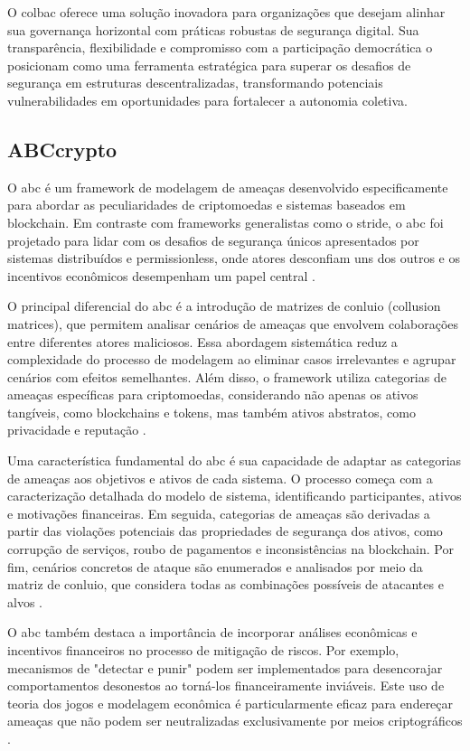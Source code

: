 O \gls{colbac} oferece uma solução inovadora para organizações que desejam
alinhar sua governança horizontal com práticas robustas de segurança
digital. Sua transparência, flexibilidade e compromisso com a
participação democrática o posicionam como uma ferramenta estratégica
para superar os desafios de segurança em estruturas descentralizadas,
transformando potenciais vulnerabilidades em oportunidades para
fortalecer a autonomia coletiva.

\subsection{ABCcrypto}
\label{subsec:abccrypto}

O \gls{abc} é um framework de modelagem de
ameaças desenvolvido especificamente para abordar as peculiaridades de
criptomoedas e sistemas baseados em blockchain. Em contraste com
frameworks generalistas como o \gls{stride}, o \gls{abc} foi projetado para lidar
com os desafios de segurança únicos apresentados por sistemas
distribuídos e permissionless, onde atores desconfiam uns dos outros e
os incentivos econômicos desempenham um papel central
\cite{AbcCrypto}.

O principal diferencial do \gls{abc} é a introdução de matrizes de conluio
(collusion matrices), que permitem analisar cenários de ameaças que
envolvem colaborações entre diferentes atores maliciosos. Essa
abordagem sistemática reduz a complexidade do processo de modelagem ao
eliminar casos irrelevantes e agrupar cenários com efeitos
semelhantes. Além disso, o framework utiliza categorias de ameaças
específicas para criptomoedas, considerando não apenas os ativos
tangíveis, como blockchains e tokens, mas também ativos abstratos,
como privacidade e reputação \cite{AbcCrypto}.

Uma característica fundamental do \gls{abc} é sua capacidade de adaptar as
categorias de ameaças aos objetivos e ativos de cada sistema. O
processo começa com a caracterização detalhada do modelo de sistema,
identificando participantes, ativos e motivações financeiras. Em
seguida, categorias de ameaças são derivadas a partir das violações
potenciais das propriedades de segurança dos ativos, como corrupção de
serviços, roubo de pagamentos e inconsistências na blockchain. Por
fim, cenários concretos de ataque são enumerados e analisados por meio
da matriz de conluio, que considera todas as combinações possíveis de
atacantes e alvos \cite{AbcCrypto}.

O \gls{abc} também destaca a importância de incorporar análises econômicas e
incentivos financeiros no processo de mitigação de riscos. Por
exemplo, mecanismos de "detectar e punir" podem ser implementados para
desencorajar comportamentos desonestos ao torná-los financeiramente
inviáveis. Este uso de teoria dos jogos e modelagem econômica é
particularmente eficaz para endereçar ameaças que não podem ser
neutralizadas exclusivamente por meios criptográficos
\cite{AbcCrypto}.

